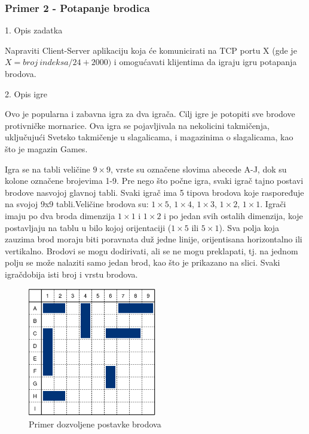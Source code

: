 \subsubsection{Primer 2 - Potapanje brodica}

\large{1. Opis zadatka}
\normalsize

Napraviti Client-Server aplikaciju koja će komunicirati na TCP portu X (gde je $X = broj\ indeksa / 24 + 2000)$ i omogućavati klijentima da igraju igru potapanja brodova.

\large{2. Opis igre}
\normalsize

Ovo je popularna i zabavna igra za dva igrača. Cilj igre je potopiti sve brodove protivničke mornarice. Ova igra se pojavljivala na nekolicini takmičenja, uključujući Svetsko takmičenje u slagalicama, i magazinima o slagalicama, kao što je magazin Games.

Igra se na tabli veličine $9\times9$, vrste su označene slovima abecede A-J, dok su kolone označene brojevima 1-9. Pre nego što počne igra, svaki igrač tajno postavi brodove nasvojoj glavnoj tabli. Svaki igrač ima 5 tipova brodova koje raspoređuje na svojoj 9x9 tabli.Veličine brodova su: $1\times5$, $1\times4$, $1\times3$, $1\times2$, $1\times1$. Igrači imaju po dva broda dimenzija $1\times1$ i $1\times2$ i po jedan svih ostalih dimenzija, koje postavljaju na tablu u bilo kojoj orijentaciji ($1\times5$ ili $5\times1$). Sva polja koja zauzima brod moraju biti poravnata duž jedne linije, orijentisana horizontalno ili vertikalno. Brodovi se mogu dodirivati, ali se ne mogu preklapati, tj. na jednom polju se može nalaziti samo jedan brod, kao što je prikazano na slici. Svaki igračdobija isti broj i vrstu brodova.

\begin{figure}[H]
    \centering
    \includegraphics[width=0.5\textwidth]{Slike/PTP/Dozvoljene pozicije.png}
    \caption*{Primer dozvoljene postavke brodova}
    \label{fig:dozvoljene_postavke}
\end{figure}

